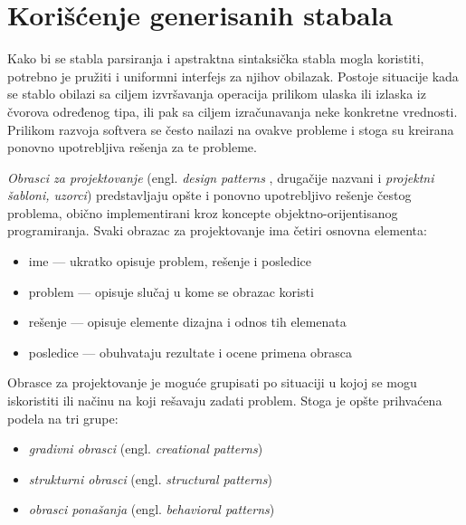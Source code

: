 \section{Korišćenje generisanih stabala}
\label{sec:DesignPatterns}

Kako bi se stabla parsiranja i apstraktna sintaksička stabla mogla koristiti, potrebno je pružiti i uniformni interfejs za njihov obilazak. Postoje situacije kada se stablo obilazi sa ciljem izvršavanja operacija prilikom ulaska ili izlaska iz čvorova određenog tipa, ili pak sa ciljem izračunavanja neke konkretne vrednosti. Prilikom razvoja softvera se često nailazi na ovakve probleme i stoga su kreirana ponovno upotrebljiva rešenja za te probleme. 

\emph{Obrasci za projektovanje} (engl. \emph{design patterns} \cite{DesignPatterns}, drugačije nazvani i \emph{projektni šabloni, uzorci}) predstavljaju opšte i ponovno upotrebljivo rešenje čestog problema, obično implementirani kroz koncepte objektno-orijentisanog programiranja. Svaki obrazac za projektovanje ima četiri osnovna elementa:
\begin{itemize}
    \item ime --- ukratko opisuje problem, rešenje i posledice
    \item problem --- opisuje slučaj u kome se obrazac koristi
    \item rešenje --- opisuje elemente dizajna i odnos tih elemenata
    \item posledice --- obuhvataju rezultate i ocene primena obrasca
\end{itemize}

Obrasce za projektovanje je moguće grupisati po situaciji u kojoj se mogu iskoristiti ili načinu na koji rešavaju zadati problem. Stoga je opšte prihvaćena podela na tri grupe:
\begin{itemize}
    \item \emph{gradivni obrasci} (engl. \emph{creational patterns})
    \item \emph{strukturni obrasci} (engl. \emph{structural patterns})
    \item \emph{obrasci ponašanja} (engl. \emph{behavioral patterns})
\end{itemize}

